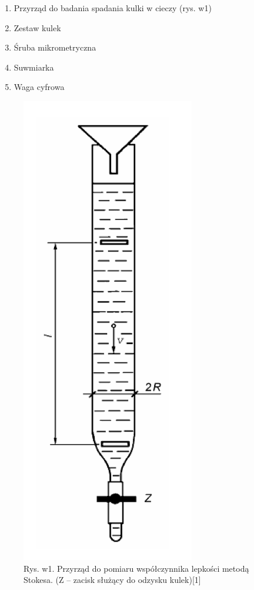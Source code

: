 \documentclass{article}
\begin{document}
\begin{enumerate}
    \item Przyrząd do badania spadania kulki w cieczy (rys. w1)
    \item Zestaw kulek
    \item Śruba mikrometryczna
    \item Suwmiarka
    \item Waga cyfrowa
\end{enumerate}

\begin{figure}[h]
\centering
\captionsetup{width=.7\linewidth}
\includegraphics[scale=0.4]{rysunek1.png}
\caption{Rys. w1. Przyrząd do pomiaru współczynnika lepkości metodą Stokesa. (Z – zacisk służący do odzysku kulek)[1]}
\label{fig:example}
\end{figure}
\end{document}
